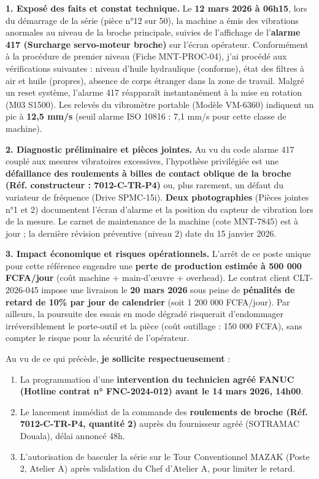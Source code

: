 \documentclass[11pt]{article}
\begin{document}
\begin{exoresolu}
\vspace{0.3cm}
\noindent
\textbf{1. Exposé des faits et constat technique.}
Le \textbf{12 mars 2026 à 06h15}, lors du démarrage de la série (pièce n°12 sur 50), la machine a émis des vibrations anormales au niveau de la broche principale, suivies de l'affichage de l'\textbf{alarme 417 (Surcharge servo-moteur broche)} sur l'écran opérateur. Conformément à la procédure de premier niveau (Fiche MNT-PROC-04), j'ai procédé aux vérifications suivantes : niveau d'huile hydraulique (conforme), état des filtres à air et huile (propres), absence de corps étranger dans la zone de travail. Malgré un reset système, l'alarme 417 réapparaît instantanément à la mise en rotation (M03 S1500). Les relevés du vibromètre portable (Modèle VM-6360) indiquent un pic à \textbf{12,5 mm/s} (seuil alarme ISO 10816 : 7,1 mm/s pour cette classe de machine).

\vspace{0.3cm}
\noindent
\textbf{2. Diagnostic préliminaire et pièces jointes.}
Au vu du code alarme 417 couplé aux mesures vibratoires excessives, l'hypothèse privilégiée est une \textbf{défaillance des roulements à billes de contact oblique de la broche (Réf. constructeur : 7012-C-TR-P4)} ou, plus rarement, un défaut du variateur de fréquence (Drive SPMC-15i). \textbf{Deux photographies} (Pièces jointes n°1 et 2) documentent l'écran d'alarme et la position du capteur de vibration lors de la mesure. Le carnet de maintenance de la machine (cote MNT-7845) est à jour ; la dernière révision préventive (niveau 2) date du 15 janvier 2026.

\vspace{0.3cm}
\noindent
\textbf{3. Impact économique et risques opérationnels.}
L'arrêt de ce poste unique pour cette référence engendre une \textbf{perte de production estimée à 500 000 FCFA/jour} (coût machine + main-d'œuvre + overhead). Le contrat client CLT-2026-045 impose une livraison le \textbf{20 mars 2026} sous peine de \textbf{pénalités de retard de 10\% par jour de calendrier} (soit 1 200 000 FCFA/jour). Par ailleurs, la poursuite des essais en mode dégradé risquerait d'endommager irréversiblement le porte-outil et la pièce (coût outillage : 150 000 FCFA), sans compter le risque pour la sécurité de l'opérateur.

\vspace{0.5cm}
\noindent
Au vu de ce qui précède, \textbf{je sollicite respectueusement} :
\begin{enumerate}
    \item La programmation d'une \textbf{intervention du technicien agréé FANUC (Hotline contrat n° FNC-2024-012) avant le 14 mars 2026, 14h00}.
    \item Le lancement immédiat de la commande des \textbf{roulements de broche (Réf. 7012-C-TR-P4, quantité 2)} auprès du fournisseur agréé (SOTRAMAC Douala), délai annoncé 48h.
    \item L'autorisation de basculer la série sur le Tour Conventionnel MAZAK (Poste 2, Atelier A) après validation du Chef d'Atelier A, pour limiter le retard.
\end{enumerate}


\end{exoresolu}
\end{document}
